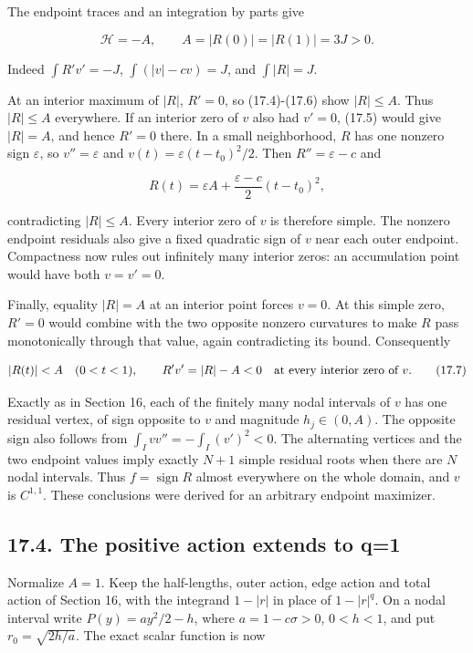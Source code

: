 \documentclass[11pt]{article}
\begin{document}
The endpoint traces and an integration by parts give

\[
\mathcal H=-A,\qquad A=|R(0)|=|R(1)|=3J>0.
\tag{17.6}
\]

Indeed \(\int R'v'=-J\), \(\int(|v|-cv)=J\), and \(\int|R|=J\).

At an interior maximum of \(|R|\), \(R'=0\), so (17.4)-(17.6) show
\(|R|\le A\). Thus \(|R|\le A\) everywhere. If an interior zero of \(v\)
also had \(v'=0\), (17.5) would give \(|R|=A\), and hence \(R'=0\)
there. In a small neighborhood, \(R\) has one nonzero sign
\(\varepsilon\), so \(v''=\varepsilon\) and
\(v(t)=\varepsilon(t-t_0)^2/2\). Then \(R''=\varepsilon-c\) and

\[
R(t)=\varepsilon A+\frac{\varepsilon-c}{2}(t-t_0)^2,
\]

contradicting \(|R|\le A\). Every interior zero of \(v\) is therefore
simple. The nonzero endpoint residuals also give a fixed quadratic sign
of \(v\) near each outer endpoint. Compactness now rules out infinitely
many interior zeros: an accumulation point would have both \(v=v'=0\).

Finally, equality \(|R|=A\) at an interior point forces \(v=0\). At this
simple zero, \(R'=0\) would combine with the two opposite nonzero
curvatures to make \(R\) pass monotonically through that value, again
contradicting its bound. Consequently

\[
|R(t)|<A\quad(0<t<1),\qquad R'v'=|R|-A<0
\quad\hbox{at every interior zero of }v.
\tag{17.7}
\]

Exactly as in Section 16, each of the finitely many nodal intervals of
\(v\) has one residual vertex, of sign opposite to \(v\) and magnitude
\(h_j\in(0,A)\). The opposite sign also follows from
\(\int_I vv''=-\int_I(v')^2<0\). The alternating vertices and the two
endpoint values imply exactly \(N+1\) simple residual roots when there
are \(N\) nodal intervals. Thus \(f=\operatorname{sign}R\) almost
everywhere on the whole domain, and \(v\) is \(C^{1,1}\). These
conclusions were derived for an arbitrary endpoint maximizer.

\subsection{17.4. The positive action extends to
q=1}\label{the-positive-action-extends-to-q1}

Normalize \(A=1\). Keep the half-lengths, outer action, edge action and
total action of Section 16, with the integrand \(1-|r|\) in place of
\(1-|r|^q\). On a nodal interval write \(P(y)=ay^2/2-h\), where
\(a=1-c\sigma>0\), \(0<h<1\), and put \(r_0=\sqrt{2h/a}\). The exact
scalar function is now
\end{document}
